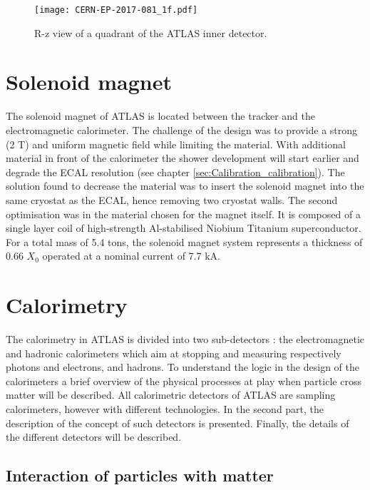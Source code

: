 \begin{figure}[htbp]
\centering
\texttt{[image: CERN-EP-2017-081\_1f.pdf]}
\caption{\label{fig:org052773b}
R-z view of a quadrant of the ATLAS inner detector. \cite{CERN-EP-2017-081}}
\end{figure}


\section{Solenoid magnet}
\label{sec:orgc52db09}

The solenoid magnet of ATLAS is located between the tracker and the electromagnetic calorimeter.
The challenge of the design was to provide a strong (2 T) and uniform magnetic field while limiting the material.
With additional material in front of the calorimeter the shower development will start earlier and degrade the ECAL resolution (see chapter \ref{sec:Calibration_calibration}).
The solution found to decrease the material was to insert the solenoid magnet into the same cryostat as the ECAL, hence removing two cryostat walls.
The second optimisation was in the  material chosen for the magnet itself.
It is composed of a single layer coil of high-strength Al-stabilised Niobium Titanium superconductor.
For a total mass of 5.4 tons, the solenoid magnet system represents a thickness of 0.66 $X_0$ operated at a nominal current of 7.7 kA.

\section{Calorimetry}
\label{sec:orgaf4b368}
\label{sec:detector_calorimetry}

The calorimetry in ATLAS is divided into two sub-detectors : the electromagnetic and hadronic calorimeters which aim at stopping and measuring respectively photons and electrons, and hadrons.
To understand the logic in the design of the calorimeters a brief overview of the physical processes at play when particle cross matter will be described.
All calorimetric detectors of ATLAS are sampling calorimeters, however with different technologies.
In the second part, the description of the concept of such detectors is presented.
Finally, the details of the different detectors will be described.

\subsection{Interaction of particles with matter}
\label{sec:org1dd92db}

